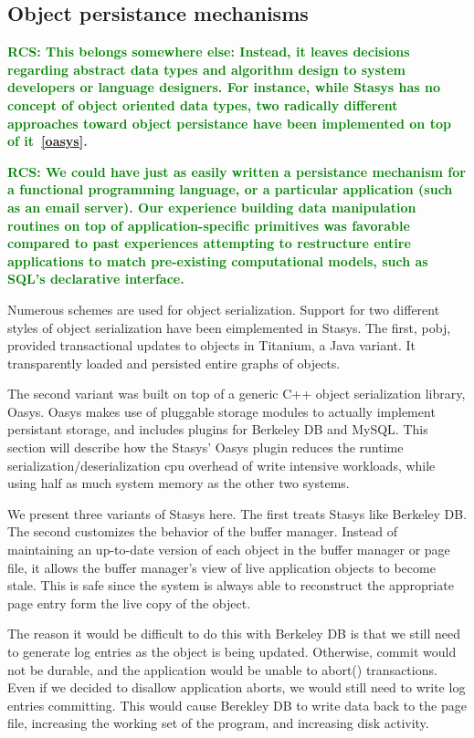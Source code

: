 \documentclass[letterpaper,twocolumn,10pt]{article}
\newcommand{\yad}{Stasys\xspace}
\newcommand{\yads}{Stasys'\xspace}
\newcommand{\oasys}{Oasys\xspace}
\newcommand{\rcs}[1]{\textcolor{green}{\bf RCS: #1}}
\begin{document}
\subsection{Object persistance mechanisms}
\rcs{ This belongs somewhere else: Instead, it leaves decisions regarding abstract data types and
algorithm design to system developers or language designers.  For
instance, while \yad has no concept of object oriented data types, two
radically different approaches toward object persistance have been
implemented on top of it~\ref{oasys}.}

\rcs{We could have just as easily written a persistance mechanism for a
functional programming language, or a particular application (such as
an email server).  Our experience building data manipulation routines
on top of application-specific primitives was favorable compared to
past experiences attempting to restructure entire applications to
match pre-existing computational models, such as SQL's declarative
interface.}




Numerous schemes are used for object serialization.  Support for two
different styles of object serialization have been eimplemented in
\yad.  The first, pobj, provided transactional updates to objects in
Titanium, a Java variant.  It transparently loaded and persisted
entire graphs of objects.

The second variant was built on top of a generic C++ object
serialization library, \oasys.  \oasys makes use of pluggable storage
modules to actually implement persistant storage, and includes plugins
for Berkeley DB and MySQL.  This section will describe how the \yads
\oasys plugin reduces the runtime serialization/deserialization cpu
overhead of write intensive workloads, while using half as much system
memory as the other two systems.

We present three variants of \yad here.  The first treats \yad like
Berkeley DB.  The second customizes the behavior of the buffer
manager.  Instead of maintaining an up-to-date version of each object
in the buffer manager or page file, it allows the buffer manager's
view of live application objects to become stale.  This is safe since
the system is always able to reconstruct the appropriate page entry
form the live copy of the object.

The reason it would be difficult to do this with Berkeley DB is that
we still need to generate log entries as the object is being updated.
Otherwise, commit would not be durable, and the application would be
unable to abort() transactions.  Even if we decided to disallow
application aborts, we would still need to write log entries
committing.  This would cause Berekley DB to write data back to the
page file, increasing the working set of the program, and increasing
disk activity.
\end{document}
